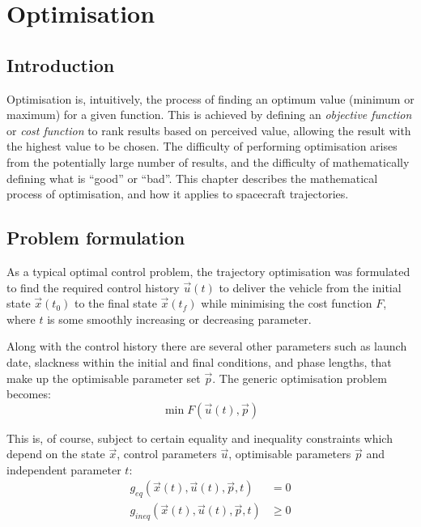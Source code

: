 \chapter{Optimisation} \label{cha:Optimisation}
\section{Introduction} \label{sec:Optimisation-Introduction}

Optimisation is, intuitively, the process of finding an optimum value (minimum or maximum) for a given function. This is achieved by defining an \emph{objective function} or \emph{cost function} to rank results based on perceived value, allowing the result with the highest value to be chosen. The difficulty of performing optimisation arises from the potentially large number of results, and the difficulty of mathematically defining what is \enquote{good} or \enquote{bad}. This chapter describes the mathematical process of optimisation, and how it applies to spacecraft trajectories.

\section{Problem formulation}

As a typical optimal control problem, the trajectory optimisation was formulated to find the required control history $\vec{u}(t)$ to deliver the vehicle from the initial state $\vec{x}(t_0)$ to the final state $\vec{x}(t_f)$ while minimising the cost function $F$, where $t$ is some smoothly increasing or decreasing parameter. 

Along with the control history there are several other parameters such as launch date, slackness within the initial and final conditions, and phase lengths, that make up the optimisable parameter set $\vec{p}$. The generic optimisation problem becomes:
\begin{equation}
\min F(\vec{u}(t),\vec{p})
\end{equation}

This is, of course, subject to certain equality and inequality constraints which depend on the state $\vec{x}$, control parameters $\vec{u}$, optimisable parameters $\vec{p}$ and independent parameter $t$:
\begin{align}
g_{eq}(\vec{x}(t),\vec{u}(t),\vec{p},t) &= 0 \\
g_{ineq}(\vec{x}(t),\vec{u}(t),\vec{p},t) &\ge 0 
\end{align}

